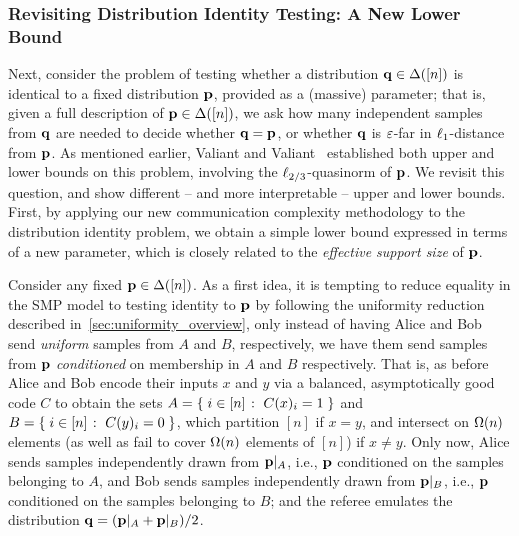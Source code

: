 \subsubsection{Revisiting Distribution Identity Testing: A New Lower Bound}
\label{sec:overview:lb}
Next, consider the problem of testing whether a distribution $\q\in\distribs{[n]}$ is identical to a fixed distribution $\p$, provided as a (massive) parameter; that is, given a full description of $\p\in\distribs{[n]}$, we ask how many independent samples from $\q$ are needed to decide whether $\q=\p$, or whether $\q$ is $\eps$-far in $\lp[1]$-distance from $\p$. As mentioned earlier, Valiant and Valiant~\cite{VV:14} established both upper and lower bounds on this problem, involving the $\lp[2/3]$-quasinorm of $\p$. We revisit this question, and show different -- and more interpretable -- upper and lower bounds. First, by applying our new communication complexity methodology to the distribution identity problem, we obtain a simple lower bound expressed in terms of a new parameter, which is closely related to the \emph{effective support size} of $\p$.

Consider any fixed $\p\in\distribs{[n]}$. As a first idea, it is tempting to reduce equality in the SMP model to testing identity to $\p$ by following the uniformity reduction described in~\cref{sec:uniformity_overview}, only instead of having Alice and Bob send \emph{uniform} samples from $A$ and $B$, respectively, we have them send samples from $\p$ \emph{conditioned} on membership in $A$ and $B$ respectively. That is, as before Alice and Bob encode their inputs $x$ and $y$ via a balanced, asymptotically good code $C$ to obtain the sets $A = \setOfSuchThat{ i\in[n] }{ C(x)_i = 1 }$ and $B = \setOfSuchThat{ i\in[n] }{ C(y)_i = 0 }$, which partition $[n]$ if $x=y$, and intersect on $\bigOmega{n}$ elements (as well as fail to cover $\bigOmega{n}$ elements of $[n]$) if $x \neq y$. Only now, Alice sends samples independently drawn from $\p|_A$, i.e., $\p$ conditioned on the samples belonging to $A$, and Bob sends samples independently drawn from $\p|_B$, i.e., $\p$ conditioned on the samples belonging to $B$; and the referee emulates the distribution $\q = (\p|_A + \p|_B)/2$.

